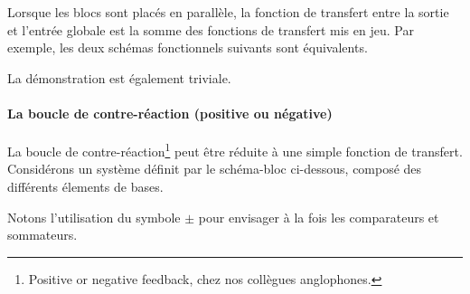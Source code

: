 Lorsque les blocs sont placés en parallèle, la fonction de transfert 
entre la sortie et l'entrée globale est la somme des fonctions de transfert 
mis en jeu. Par exemple, les deux schémas fonctionnels suivants 
sont équivalents.

\begin{center}

\end{center}

La démonstration est également triviale.

\paragraph{La boucle de contre-réaction (positive ou négative)
          \label{sec-boucle}}

La boucle de contre-réaction\footnote{\og Positive or negative feedback\fg, 
chez nos collègues anglophones.} peut être réduite à une simple fonction 
de transfert. Considérons un système définit par le schéma-bloc ci-dessous, 
composé des différents élements de bases.

\begin{center}
\end{center}
Notons l'utilisation du symbole $\pm$ pour envisager à la fois les 
comparateurs et sommateurs.

